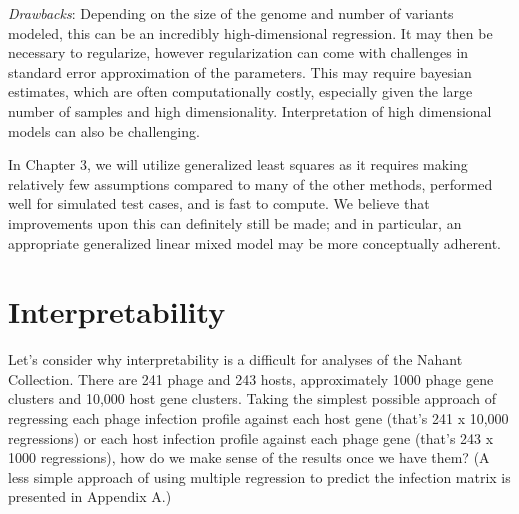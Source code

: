 \documentclass[12pt,twoside]{mitthesis-manusdown}
\begin{document}
\begin{enumerate}
  \emph{Drawbacks}: Depending on the size of the genome and number of
  variants modeled, this can be an incredibly high-dimensional
  regression. It may then be necessary to regularize, however
  regularization can come with challenges in standard error
  approximation of the parameters. This may require bayesian estimates,
  which are often computationally costly, especially given the large
  number of samples and high dimensionality. Interpretation of high
  dimensional models can also be challenging.
\end{enumerate}
In Chapter 3, we will utilize generalized least squares as it requires
making relatively few assumptions compared to many of the other methods,
performed well for simulated test cases, and is fast to compute. We
believe that improvements upon this can definitely still be made; and in
particular, an appropriate generalized linear mixed model may be more
conceptually adherent.

\section{Interpretability}\label{interpretability}

Let's consider why interpretability is a difficult for analyses of the
Nahant Collection. There are 241 phage and 243 hosts, approximately 1000
phage gene clusters and 10,000 host gene clusters. Taking the simplest
possible approach of regressing each phage infection profile against
each host gene (that's 241 x 10,000 regressions) or each host infection
profile against each phage gene (that's 243 x 1000 regressions), how do
we make sense of the results once we have them? (A less simple approach
of using multiple regression to predict the infection matrix is
presented in Appendix A.)
\end{document}

